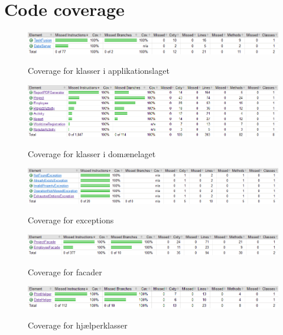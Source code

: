 \section{Code coverage}\label{chap:code_coverage}
\begin{figure}[H]
    \centering
    \caption{Coverage for klasser i applikationslaget}
    \includegraphics[width = 12cm, keepaspectratio]{ImplementationAndTest/Diagrams/coverage/coverage_app.png}
    \label{fig:coverage_app}
\end{figure}
\begin{figure}[H]
    \centering
    \caption{Coverage for klasser i domænelaget}
    \includegraphics[width = 14cm, keepaspectratio]{ImplementationAndTest/Diagrams/coverage/coverage_domain.png}
    \label{fig:coverage_domain}
\end{figure}
\begin{figure}[H]
    \centering
    \caption{Coverage for exceptions}
    \includegraphics[width = 12cm, keepaspectratio]{ImplementationAndTest/Diagrams/coverage/coverage_exceptions.png}
    \label{fig:coverage_exceptions}
\end{figure}
\begin{figure}[H]
    \centering
    \caption{Coverage for facader}
    \includegraphics[width = 12cm, keepaspectratio]{ImplementationAndTest/Diagrams/coverage/coverage_facades.png}
    \label{fig:coverage_facades}
\end{figure}
\begin{figure}[H]
    \centering
    \caption{Coverage for hjælperklasser}
    \includegraphics[width = 12cm, keepaspectratio]{ImplementationAndTest/Diagrams/coverage/coverage_helpers.png}
    \label{fig:coverage_helpers}
\end{figure}
